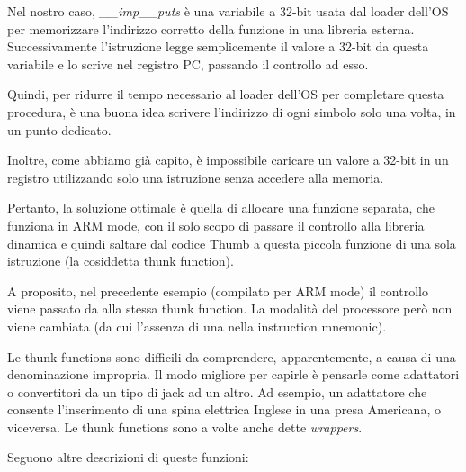 Nel nostro caso, \emph{\_\_imp\_\_puts} è una variabile a 32-bit usata dal loader dell'\ac{OS} per memorizzare l'indirizzo corretto
della funzione in una libreria esterna.
Successivamente l'istruzione  legge semplicemente il valore a 32-bit da questa variabile e lo scrive nel registro \ac{PC},
passando il controllo ad esso.

Quindi, per ridurre il tempo necessario al loader dell'\ac{OS} per completare questa procedura, è una buona idea scrivere l'indirizzo
di ogni simbolo solo una volta, in un punto dedicato.

Inoltre, come abbiamo già capito, è impossibile caricare un valore a 32-bit in un registro utilizzando solo una istruzione senza
accedere alla memoria.

Pertanto, la soluzione ottimale è quella di allocare una funzione separata, che funziona in ARM mode, con il solo scopo di passare
il controllo alla libreria dinamica e quindi saltare dal codice Thumb a questa piccola funzione di una sola istruzione
(la cosiddetta \gls{thunk function}).

A proposito, nel precedente esempio (compilato per ARM mode) il controllo viene passato da  alla stessa \gls{thunk function}.
La modalità del processore però non viene cambiata (da cui l'assenza di una  nella instruction mnemonic).


Le thunk-functions sono difficili da comprendere, apparentemente, a causa di una denominazione impropria.
Il modo migliore per capirle è pensarle come adattatori o convertitori da un tipo di jack ad un altro.
Ad esempio, un adattatore che consente l'inserimento di una spina elettrica Inglese in una presa Americana, o viceversa.
Le thunk functions sono a volte anche dette \emph{wrappers}.

Seguono altre descrizioni di queste funzioni:

